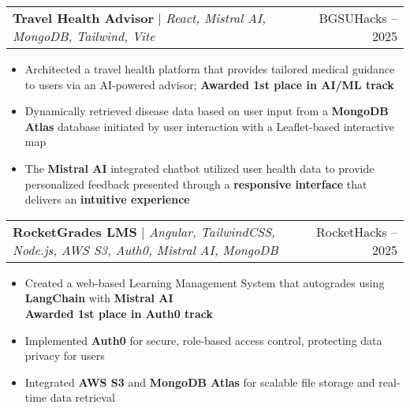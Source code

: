 \documentclass[letterpaper,11pt]{article}
\makeatletter
\newcommand{\resumeItem}[1]{
  \item\small{
    {#1 \vspace{-2pt}}
  }
}
\newcommand{\resumeProjectHeading}[2]{
    \item
    \begin{tabular*}{0.97\textwidth}{l@{\extracolsep{\fill}}r}
      \small#1 & #2 \\
    \end{tabular*}\vspace{-7pt}
}
\newcommand{\resumeItemListStart}{\begin{itemize}}
\newcommand{\resumeItemListEnd}{\end{itemize}\vspace{-5pt}}
\makeatother
\begin{document}
      
      \resumeProjectHeading
          {\textbf{Travel Health Advisor} $|$ \emph{React, Mistral AI, MongoDB, Tailwind, Vite}}{BGSUHacks -- 2025}
          \resumeItemListStart
            \resumeItem{Architected a travel health platform that provides tailored medical guidance to users via an AI-powered advisor; \textbf{Awarded 1st place in AI/ML track}}
            \resumeItem{Dynamically retrieved disease data based on user input from a \textbf{MongoDB Atlas} database initiated by user interaction with a Leaflet-based interactive map}
            \resumeItem{The \textbf{Mistral AI} integrated chatbot utilized user health data to provide personalized feedback presented through a \textbf{responsive interface} that delivers an \textbf{intuitive experience}}
          \resumeItemListEnd

      \resumeProjectHeading
          {\textbf{RocketGrades LMS} $|$ \emph{Angular, TailwindCSS, Node.js, AWS S3, Auth0, Mistral AI, MongoDB}}{RocketHacks -- 2025}
          \resumeItemListStart
             \resumeItem{Created a web-based Learning Management System that autogrades using \textbf{LangChain} with \textbf{Mistral AI} \\ \textbf{Awarded 1st place in Auth0 track}}
            \resumeItem{Implemented \textbf{Auth0} for secure, role-based access control, protecting data privacy for users}
            \resumeItem{Integrated \textbf{AWS S3} and \textbf{MongoDB Atlas} for scalable file storage and real-time data retrieval}
          \resumeItemListEnd
          

      
\end{document}
